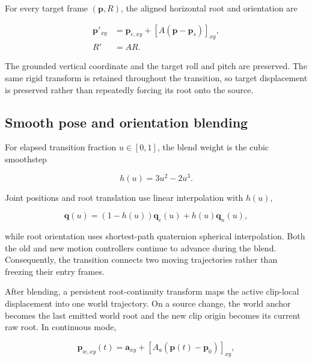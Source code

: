 For every target frame $(\mathbf{p},R)$, the aligned horizontal root and
orientation are

\begin{align}
    \mathbf{p}'_{xy}
       &=\mathbf{p}_{c,xy}+
          \left[A(\mathbf{p}-\mathbf{p}_s)\right]_{xy},\\
    R'&=AR.
    \label{eq:ch5_root_alignment_transform}
\end{align}

The grounded vertical coordinate and the target roll and pitch are preserved.
The same rigid transform is retained throughout the transition, so target
displacement is preserved rather than repeatedly forcing its root onto the
source.

\subsection{Smooth pose and orientation blending}
\label{subsec:ch5_transition_blending}

For elapsed transition fraction $u\in[0,1]$, the blend weight is the cubic
smoothstep

\begin{equation}
    h(u)=3u^2-2u^3.
    \label{eq:ch5_smoothstep}
\end{equation}

Joint positions and root translation use linear interpolation with $h(u)$,

\begin{equation}
    \mathbf{q}(u)=(1-h(u))\mathbf{q}_c(u)
                   +h(u)\mathbf{q}_n(u),
    \label{eq:ch5_joint_blend}
\end{equation}

while root orientation uses shortest-path quaternion spherical interpolation.
Both the old and new motion controllers continue to advance during the blend.
Consequently, the transition connects two moving trajectories rather than
freezing their entry frames.

After blending, a persistent root-continuity transform maps the active
clip-local displacement into one world trajectory. On a source change, the
world anchor becomes the last emitted world root and the new clip origin
becomes its current raw root. In continuous mode,

\begin{equation}
    \mathbf{p}_{w,xy}(t)
      =\mathbf{a}_{xy}
       +\left[A_a(\mathbf{p}(t)-\mathbf{p}_0)\right]_{xy},
    \label{eq:ch5_world_root_continuity}
\end{equation}

